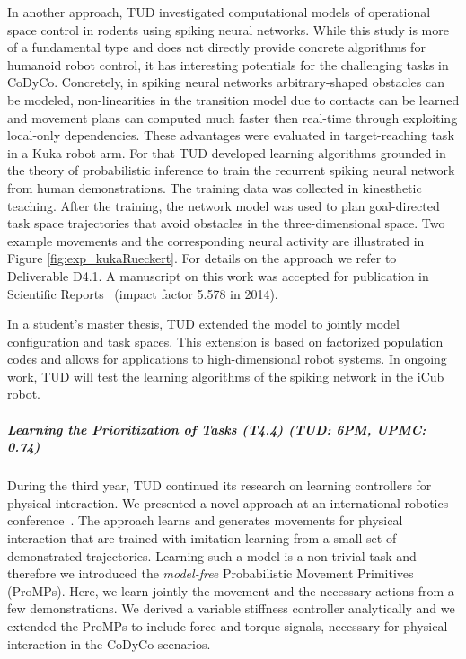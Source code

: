 In another approach, TUD investigated computational models of operational space 
control in rodents using spiking neural networks. While this study is more of a 
fundamental type and does not directly provide concrete algorithms for humanoid 
robot control, it has interesting potentials for the challenging tasks in 
CoDyCo. Concretely, in spiking neural networks arbitrary-shaped obstacles can be 
modeled, non-linearities in the transition model due to contacts can be learned 
and movement plans can computed much faster then real-time through exploiting 
local-only dependencies. These advantages were evaluated in target-reaching task 
in a Kuka robot arm. For that TUD developed learning algorithms grounded in the 
theory of probabilistic inference to train the recurrent spiking neural network 
from human demonstrations. The training data was collected in kinesthetic 
teaching. After the training, the network model was used to plan goal-directed 
task space trajectories that avoid obstacles in the three-dimensional space. Two 
example movements and the corresponding neural activity are illustrated in 
Figure \ref{fig:exp_kukaRueckert}. For details on the approach we refer to 
Deliverable D4.1. A manuscript on this work was accepted for publication in 
Scientific Reports~\cite{Rueckert_SR_2016} (impact factor 5.578 in 2014). 

In a student's master thesis, TUD extended the model to jointly model 
configuration and task spaces. This extension is based on factorized population 
codes and allows for applications to high-dimensional robot systems. In ongoing 
work, TUD will test the learning algorithms of the spiking network in the iCub 
robot.    


\subparagraph*{Learning the Prioritization of Tasks (T4.4) (TUD: 6PM, UPMC: 0.74)}%

During the third year, TUD continued its research on learning controllers for 
physical interaction. We presented a novel approach at an international robotics 
conference~\cite{paraschos2015model}. The approach learns and generates 
movements for physical interaction that are trained with imitation learning from 
a small set of demonstrated trajectories. Learning such a model is a non-trivial 
task and therefore we introduced the \textit{model-free} Probabilistic Movement 
Primitives (ProMPs). Here, we learn jointly the movement and the necessary 
actions from a few demonstrations. We derived a variable stiffness controller 
analytically and we extended the ProMPs to include force and torque signals, 
necessary for physical interaction in the CoDyCo scenarios. 

